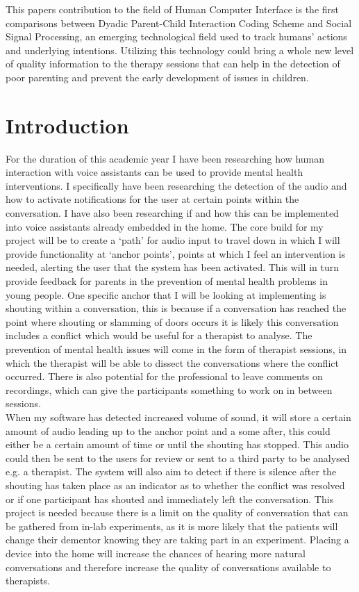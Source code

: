 \documentclass[a4paper,11pt]{report}
\begin{document}
This papers contribution to the field of Human Computer Interface is the first comparisons between Dyadic Parent-Child Interaction Coding Scheme and Social Signal Processing, an emerging technological field used to track humans’ actions and underlying intentions. Utilizing this technology could bring a whole new level of quality information to the therapy sessions that can help in the detection of poor parenting and prevent the early development of issues in children.\\

\tableofcontents
\newpage
{}

\chapter{Introduction}
For the duration of this academic year I have been researching how human interaction with voice assistants can be used to provide mental health interventions. I specifically have been researching the detection of the audio and how to activate notifications for the user at certain points within the conversation. I have also been researching if and how this can be implemented into voice assistants already embedded in the home. The core build for my project will be to create a ‘path’ for audio input to travel down in which I will provide functionality at ‘anchor points’, points at which I feel an intervention is needed, alerting the user that the system has been activated. This will in turn provide feedback for parents in the prevention of mental health problems in young people. One specific anchor that I will be looking at implementing is shouting within a conversation, this is because if a conversation has reached the point where shouting or slamming of doors occurs it is likely this conversation includes a conflict which would be useful for a therapist to analyse. The prevention of mental health issues will come in the form of therapist sessions, in which the therapist will be able to dissect the conversations where the conflict occurred. There is also potential for the professional to leave comments on recordings, which can give the participants something to work on in between sessions. \\

When my software has detected increased volume of sound, it will store a certain amount of audio leading up to the anchor point and a some after, this could either be a certain amount of time or until the shouting has stopped. This audio could then be sent to the users for review or sent to a third party to be analysed e.g. a therapist. The system will also aim to detect if there is silence after the shouting has taken place as an indicator as to whether the conflict was resolved or if one participant has shouted and immediately left the conversation. This project is needed because there is a limit on the quality of conversation that can be gathered from in-lab experiments, as it is more likely that the patients will change their dementor knowing they are taking part in an experiment. Placing a device into the home will increase the chances of hearing more natural conversations and therefore increase the quality of conversations available to therapists. \\
\end{document}
